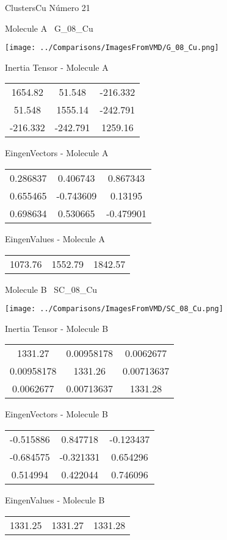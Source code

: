  \newpage

\vtab[-3cm]
\begin{center}
{\large ClustersCu \tab Número 21}
\end{center}
\begin{multicols}{2}
\begin{center}

Molecule A \
G\_08\_Cu

\texttt{[image: ../Comparisons/ImagesFromVMD/G\_08\_Cu.png]}

Inertia Tensor - Molecule A \\
\begin{tabular}{|c c c|}
1654.82	 & 	51.548	 & 	-216.332	 \\
51.548	 & 	1555.14	 & 	-242.791	 \\
-216.332	 & 	-242.791	 & 	1259.16
\end{tabular}

\vtab
 EingenVectors - Molecule A     \\
\begin{tabular}{|c c c|}
0.286837	 & 	0.406743	 & 	0.867343	 \\
0.655465	 & 	-0.743609	 & 	0.13195	 \\
0.698634	 & 	0.530665	 & 	-0.479901
\end{tabular}

\vtab
 EingenValues - Molecule A     \\
\begin{tabular}{|c c c|}
1073.76	 & 	1552.79	 & 	1842.57	 \\
\end{tabular}
\columnbreak

Molecule B \
SC\_08\_Cu

\texttt{[image: ../Comparisons/ImagesFromVMD/SC\_08\_Cu.png]}

Inertia Tensor - Molecule B \\
\begin{tabular}{|c c c|}
1331.27	 & 	0.00958178	 & 	0.0062677	 \\
0.00958178	 & 	1331.26	 & 	0.00713637	 \\
0.0062677	 & 	0.00713637	 & 	1331.28
\end{tabular}

\vtab
 EingenVectors - Molecule B     \\
\begin{tabular}{|c c c|}
-0.515886	 & 	0.847718	 & 	-0.123437	 \\
-0.684575	 & 	-0.321331	 & 	0.654296	 \\
0.514994	 & 	0.422044	 & 	0.746096
\end{tabular}

\vtab
 EingenValues - Molecule B     \\
\begin{tabular}{|c c c|}
1331.25	 & 	1331.27	 & 	1331.28	 \\
\end{tabular}

\end{center}
\end{multicols}

